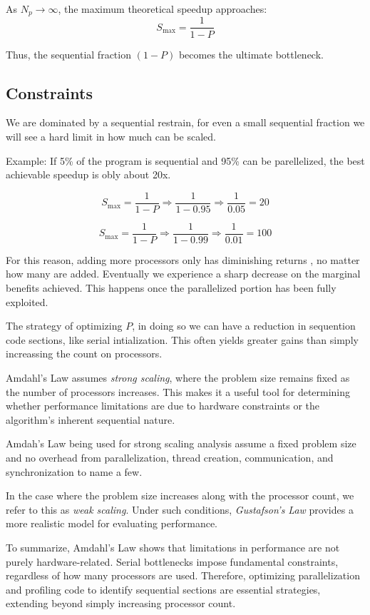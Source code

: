 \documentclass[12pt]{article}
\begin{document}
As \( N_p \to \infty \), the maximum theoretical speedup approaches:
\[
S_{\text{max}} = \frac{1}{1 - P}
\]

Thus, the sequential fraction \( (1 - P) \) becomes the ultimate bottleneck.

\subsection*{Constraints}
We are dominated by a sequential restrain, for even a small sequential fraction we will see a hard limit in how much can be scaled. 

Example: If 5\% of the program is sequential and 95\% can be parellelized, the best achievable speedup is obly about 20x.

\[
S_{\text{max}} = \frac{1}{1 - P} \Rightarrow \frac{1}{1 - 0.95} \Rightarrow \frac{1}{0.05} = 20
\]


\[
S_{\text{max}} = \frac{1}{1 - P} \Rightarrow \frac{1}{1 - 0.99} \Rightarrow \frac{1}{0.01} = 100
\]

For this reason, adding more processors only has diminishing returns , no matter how many are added. Eventually we experience a sharp decrease on the marginal benefits achieved. This happens once the parallelized portion has been fully exploited. 

The strategy of optimizing \( P \), in doing so we can have a reduction in sequention code sections, like serial intialization. This often yields greater gains than simply increassing the count on processors. 

Amdahl’s Law assumes \emph{strong scaling}, where the problem size remains fixed as the number of processors increases. This makes it a useful tool for determining whether performance limitations are due to hardware constraints or the algorithm’s inherent sequential nature.

Amdah's Law being used for strong scaling analysis assume a fixed problem size and no overhead from parallelization, thread creation, communication, and synchronization to name a few. 

In the case where the problem size increases along with the processor count, we refer to this as \emph{weak scaling}. Under such conditions, \emph{Gustafson's Law} provides a more realistic model for evaluating performance.

To summarize, Amdahl's Law shows that limitations in performance are not purely hardware-related. Serial bottlenecks impose fundamental constraints, regardless of how many processors are used. Therefore, optimizing parallelization and profiling code to identify sequential sections are essential strategies, extending beyond simply increasing processor count.
\end{document}
